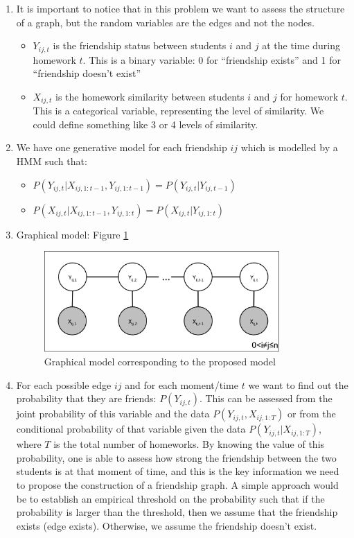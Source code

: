 \documentclass{article}
\begin{document}
\begin{enumerate}
\begin{enumerate}
\item
It is important to notice that in this problem we want to assess the structure of a graph, but the random variables are the edges and not the nodes. 
\begin{itemize}
\item
$Y_{ij,t}$ is the friendship status between students $i$ and $j$ at the time during homework $t$.
This is a binary variable: 0 for ``friendship exists'' and 1 for ``friendship doesn't exist''
\item
$X_{ij,t}$ is the homework similarity between students $i$ and $j$ for homework $t$.
This is a categorical variable, representing the level of similarity. We could define something like 3 or 4 levels of similarity.
\end{itemize}
\item
We have one generative model for each friendship $ij$ which is modelled by a HMM such that:
\begin{itemize}
\item 
$P(Y_{ij,t}|X_{ij,1:t-1},Y_{ij,1:t-1}) = P(Y_{ij,t}|Y_{ij,t-1})$ 
\item
$P(X_{ij,t}|X_{ij,1:t-1},Y_{ij,1:t}) = P(X_{ij,t}|Y_{ij,1:t})$
\end{itemize}
\item Graphical model: Figure \ref{graphmodelone}
\begin{figure}[ht!]
\centering
\includegraphics[width=90mm]{1_1_1.png}
\caption{Graphical model corresponding to the proposed model}
\label{graphmodelone}
\end{figure}
\item
For each possible edge $ij$ and for each moment/time $t$ we want to find out the probability that they are friends: $P(Y_{ij,t})$. This can be assessed from the joint probability of this variable and the data $P(Y_{ij,t},X_{ij,1:T})$ or from the conditional probability of that variable given the data $P(Y_{ij,t}|X_{ij,1:T})$, where $T$ is the total number of homeworks. By knowing the value of this probability, one is able to assess how strong the friendship between the two students is at that moment of time, and this is the key information we need to propose the construction of a friendship graph. A simple approach would be to establish an empirical threshold on the probability such that if the probability is larger than the threshold, then we assume that the friendship exists (edge exists). Otherwise, we assume the friendship doesn't exist.

\end{enumerate}
\end{enumerate}
\end{document}
